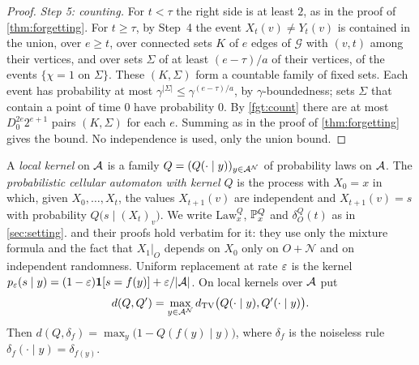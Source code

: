 \begin{proof}
\emph{Step 5: counting.} For $t<\tau$ the right side is at least $2$, as in the proof
of \cref{thm:forgetting}. For $t\ge\tau$, by Step~4 the event $X_t(v)\ne Y_t(v)$ is
contained in the union, over $e\ge t$, over connected sets $K$ of $e$ edges of
$\mathcal G$ with $(v,t)$ among their vertices, and over sets $\Sigma$ of at least
$(e-\tau)/a$ of their vertices, of the events $\{\chi=1\text{ on }\Sigma\}$. These
$(K,\Sigma)$ form a countable family of fixed sets. Each event has probability at
most $\gamma^{|\Sigma|}\le\gamma^{(e-\tau)/a}$, by $\gamma$-boundedness; sets
$\Sigma$ that contain a point of time $0$ have probability $0$. By \cref{fgt:count}
there are at most $D_0^{2e}2^{e+1}$ pairs $(K,\Sigma)$ for each $e$. Summing as in the
proof of \cref{thm:forgetting} gives the bound. No independence is used, only the
union bound.
\end{proof}

A \emph{local kernel} on $\mathcal{A}$ is a family $Q=(Q(\cdot\mid y))_{y\in\mathcal{A}^{\mathcal N}}$
of probability laws on $\mathcal{A}$. The \emph{probabilistic cellular automaton with kernel
$Q$} is the process with $X_0=x$ in which, given $X_0,\dots,X_t$, the values
$X_{t+1}(v)$ are independent and $X_{t+1}(v)=s$ with probability
$Q\bigl(s\mid(X_t)_v\bigr)$. We write $\mathrm{Law}^Q_x$, $\mathbb{P}^Q_x$ and
$\delta^Q_O(t)$ as in \cref{sec:setting}. 
and their proofs hold verbatim for it: they use only the mixture formula and the fact
that $X_1|_O$ depends on $X_0$ only on $O+\mathcal N$ and on independent randomness.
Uniform replacement at rate $\varepsilon$ is the kernel
$p_\varepsilon(s\mid y)=(1-\varepsilon)\mathbf 1[s=f(y)]+\varepsilon/|\mathcal{A}|$. On local kernels over $\mathcal{A}$ put
\[
d(Q,Q')=\max_{y\in\mathcal{A}^{\mathcal N}}d_{\mathrm{TV}}\bigl(Q(\cdot\mid y),Q'(\cdot\mid y)\bigr).
\]
Then $d(Q,\delta_f)=\max_y\bigl(1-Q(f(y)\mid y)\bigr)$, where $\delta_f$ is the
noiseless rule $\delta_f(\cdot\mid y)=\delta_{f(y)}$.

